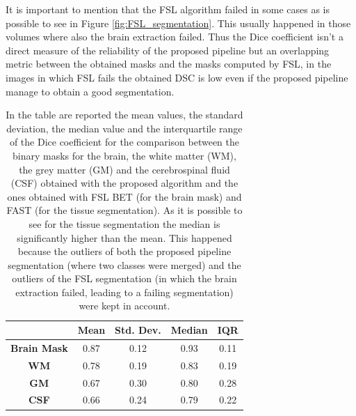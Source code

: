 \documentclass{standalone}
\begin{document}
It is important to mention that the FSL algorithm failed in some cases as is possible to see in Figure \ref{fig:FSL_segmentation}.
This usually happened in those volumes where also the brain extraction failed.
Thus the Dice coefficient isn't a direct measure of the reliability of the proposed pipeline but an overlapping metric between the obtained masks and the masks computed by FSL, in the images in which FSL fails the obtained DSC is low even if the proposed pipeline manage to obtain a good segmentation. 

\begin{table}[h!]
\centering
\begin{tabular}{c|cccc}
                    & \textbf{Mean} & \textbf{Std. Dev.} & \textbf{Median} & \textbf{IQR} \\ \hline
\textbf{Brain Mask} & 0.87          & 0.12               & 0.93            & 0.11         \\
\textbf{WM}         & 0.78          & 0.19               & 0.83            & 0.19         \\
\textbf{GM}         & 0.67          & 0.30               & 0.80            & 0.28         \\
\textbf{CSF}        & 0.66          & 0.24               & 0.79            & 0.22        
\end{tabular}
\caption{In the table are reported the mean values, the standard deviation, the median value and the interquartile range of the Dice coefficient for the comparison between the binary masks for the brain, the white matter (WM), the grey matter (GM) and the cerebrospinal fluid (CSF) obtained with the proposed algorithm and the ones obtained with FSL BET (for the brain mask) and FAST (for the tissue segmentation).
As it is possible to see for the tissue segmentation the median is significantly higher than the mean.  This happened because the outliers of both the proposed pipeline segmentation (where two classes were merged) and the outliers of the FSL segmentation (in which the brain extraction failed, leading to a failing segmentation) were kept in account.}
\label{tab:segmentation_metrics}
\end{table}
\end{document}
